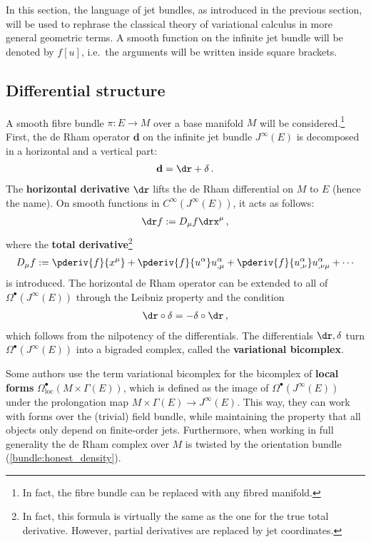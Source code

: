 \section{}\label{section:variational_bicomplex}

    In this section, the language of jet bundles, as introduced in the previous section, will be used to rephrase the classical theory of variational calculus in more general geometric terms. A smooth function on the infinite jet bundle will be denoted by $f[u]$, i.e.~the arguments will be written inside square brackets.

\subsection{Differential structure}

    A smooth fibre bundle $\pi:E\rightarrow M$ over a base manifold $M$ will be considered.\footnote{In fact, the fibre bundle can be replaced with any fibred manifold.} First, the de Rham operator $\mathbf{d}$ on the infinite jet bundle $J^\infty(E)$ is decomposed in a horizontal and a vertical part:
    \begin{gather}
        \mathbf{d} = \dr+\delta\,.
    \end{gather}
    The \textbf{horizontal derivative} $\dr$ lifts the de Rham differential on $M$ to $E$ (hence the name). On smooth functions in $C^\infty(J^\infty(E))$, it acts as follows:
    \begin{gather}
        \dr f := D_\mu f\drx^\mu\,,
    \end{gather}
    where the \textbf{total derivative}\footnote{In fact, this formula is virtually the same as the one for the true total derivative. However, partial derivatives are replaced by jet coordinates.}
    \begin{gather}
        D_\mu f := \pderiv{f}{x^\mu} + \pderiv{f}{u^\alpha}u^\alpha_{,\mu} + \pderiv{f}{u^\alpha_{,\nu}}u^\alpha_{,\nu\mu} + \cdots
    \end{gather}
    is introduced. The horizontal de Rham operator can be extended to all of $\Omega^\bullet(J^\infty(E))$ through the Leibniz property and the condition
    \begin{gather}
        \dr\circ\delta = -\delta\circ\dr\,,
    \end{gather}
    which follows from the nilpotency of the differentials. The differentials $\dr,\delta$ turn $\Omega^\bullet(J^\infty(E))$ into a bigraded complex, called the \textbf{variational bicomplex}.
    \begin{remark}
        Some authors use the term variational bicomplex for the bicomplex of \textbf{local forms} $\Omega^\bullet_\mathrm{loc}(M\times\Gamma(E))$, which is defined as the image of $\Omega^\bullet(J^\infty(E))$ under the prolongation map $M\times\Gamma(E)\rightarrow J^\infty(E)$. This way, they can work with forms over the (trivial) field bundle, while maintaining the property that all objects only depend on finite-order jets. Furthermore, when working in full generality the de Rham complex over $M$ is twisted by the orientation bundle (\cref{bundle:honest_density}).
    \end{remark}


